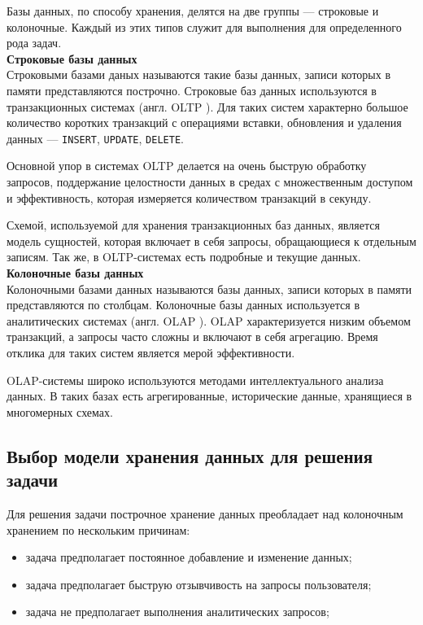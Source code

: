 \documentclass[a4paper,14pt]{extreport}
\begin{document}
Базы данных, по способу хранения, делятся на две группы --- строковые и колоночные. Каждый из этих типов служит для выполнения для определенного рода задач.\\

\noindent\textbf{Строковые базы данных}\\

Строковыми базами даных называются такие базы данных, записи которых в памяти представляются построчно. Строковые баз данных используются в транзакционных системах (англ. OLTP \cite{bib:4}). Для таких систем характерно большое количество коротких транзакций с операциями вставки, обновления и удаления данных --- \texttt{INSERT}, \texttt{UPDATE}, \texttt{DELETE}. 

Основной упор в системах OLTP делается на очень быструю обработку запросов, поддержание целостности данных в средах с множественным доступом и эффективность, которая измеряется количеством транзакций в секунду. 

Схемой, используемой для хранения транзакционных баз данных, является модель сущностей, которая включает в себя запросы, обращающиеся к отдельным записям. Так же, в OLTP-системах есть подробные и текущие данных.\\

\noindent\textbf{Колоночные базы данных}\\

Колоночными базами данных называются базы данных, записи которых в памяти представляются по столбцам. Колоночные базы данных используется в аналитических системах (англ. OLAP \cite{bib:5}). OLAP характеризуется низким объемом транзакций, а запросы часто сложны и включают в себя агрегацию. Время отклика для таких систем является мерой эффективности.

OLAP-системы широко используются методами интеллектуального анализа данных. В таких базах есть агрегированные, исторические данные, хранящиеся в многомерных схемах. 

\subsection{Выбор модели хранения данных для решения задачи}

Для решения задачи построчное хранение данных преобладает над колоночным хранением по нескольким причинам:

\begin{itemize}
	\item задача предполагает постоянное добавление и изменение данных;
	\item задача предполагает быструю отзывчивость на запросы пользователя;
	\item задача не предполагает выполнения аналитических запросов;
\end{itemize}
\end{document}
